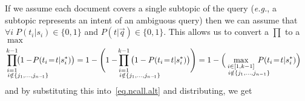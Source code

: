 If we assume each document covers a single subtopic of the query (\emph{e.g.},
a subtopic represents an intent of an ambiguous query) then we can assume that 
$\forall i \; P(t_i|s_i) \in \{0,1\}$ and $P(t|\vec{q}) \in \{0,1\}$.  This
allows us to convert a $\prod$ to a $\max$ 
\begin{align*}
  \hspace{-13mm} \prod_{\substack{i=1 \\ \hspace{14mm} i \notin \{j_1, \dots, j_{n-\!1}\}}}^{k-1} \hspace{-14mm} \bigl( 1 - \!P(t_i\!=\!t|s_i^*) \bigr) & =
1 - \Biggl( 1 - \hspace{-14mm} \prod_{\substack{i=1 \\ \hspace{14mm} i \notin \{j_1, \dots, j_{n-\!1}\}}}^{k-1} \hspace{-13mm} \bigl( 1 - P(t_i\!=\!t|s_i^*) \bigr) \Biggr) 
   = 1 - \Bigl( \hspace{-6mm} \max_{\substack{i \in [1,k-1] \\ \hspace{7mm} i \notin \{j_1, \dots, j_{n-1}\}}} \hspace{-6mm} P(t_i\!=\!t|s_i^*) \Bigr)
\end{align*}
and by substituting this into~\eqref{eq.ncall.alt} and distributing, we get
